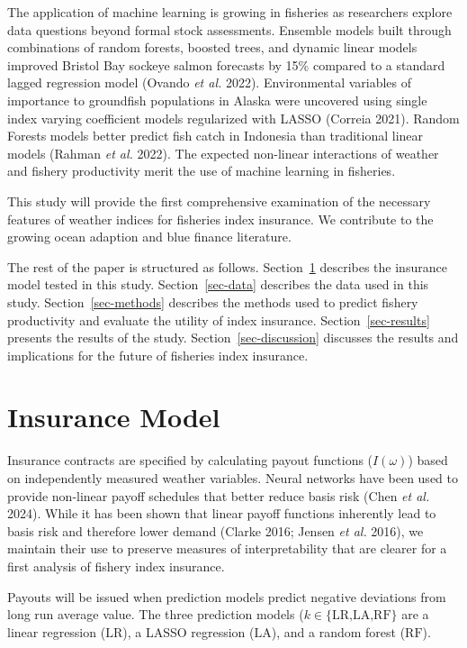 \documentclass[
  letterpaper,
  DIV=11,
  numbers=noendperiod]{scrartcl}
\begin{document}
The application of machine learning is growing in fisheries as
researchers explore data questions beyond formal stock assessments.
Ensemble models built through combinations of random forests, boosted
trees, and dynamic linear models improved Bristol Bay sockeye salmon
forecasts by 15\% compared to a standard lagged regression model (Ovando
\emph{et al.} 2022). Environmental variables of importance to groundfish
populations in Alaska were uncovered using single index varying
coefficient models regularized with LASSO (Correia 2021). Random Forests
models better predict fish catch in Indonesia than traditional linear
models (Rahman \emph{et al.} 2022). The expected non-linear interactions
of weather and fishery productivity merit the use of machine learning in
fisheries.

This study will provide the first comprehensive examination of the
necessary features of weather indices for fisheries index insurance. We
contribute to the growing ocean adaption and blue finance literature.

The rest of the paper is structured as follows. Section~\ref{sec-model}
describes the insurance model tested in this study.
Section~\ref{sec-data} describes the data used in this study.
Section~\ref{sec-methods} describes the methods used to predict fishery
productivity and evaluate the utility of index insurance.
Section~\ref{sec-results} presents the results of the study.
Section~\ref{sec-discussion} discusses the results and implications for
the future of fisheries index insurance.

\hypertarget{sec-model}{%
\section{Insurance Model}\label{sec-model}}

Insurance contracts are specified by calculating payout functions
(\(I(\omega)\)) based on independently measured weather variables.
Neural networks have been used to provide non-linear payoff schedules
that better reduce basis risk (Chen \emph{et al.} 2024). While it has
been shown that linear payoff functions inherently lead to basis risk
and therefore lower demand (Clarke 2016; Jensen \emph{et al.} 2016), we
maintain their use to preserve measures of interpretability that are
clearer for a first analysis of fishery index insurance.

Payouts will be issued when prediction models predict negative
deviations from long run average value. The three prediction models
(\(k\in\{\text{LR,LA,RF}\}\) are a linear regression (\(\text{LR}\)), a
LASSO regression (\(\text{LA}\)), and a random forest (\(\text{RF}\)).
\end{document}
